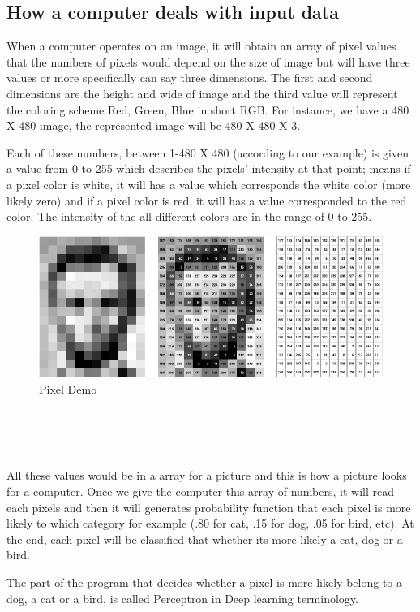 \subsection{How a computer deals with input data}
When a computer operates on an image, it will obtain an array  of pixel values that the numbers of pixels would depend on the size of image but will have three values or more specifically can say three dimensions. The first and second dimensions are the height and wide of image and the third value will represent the coloring scheme Red, Green, Blue in short RGB.  
For instance, we have a 480 X 480  image,  the  represented  image  will be 480 X 480 X 3. 

Each of these numbers, between 1-480 X 480 (according to our example) is given a value from 0 to 255 which describes the pixels' intensity at that point; means if a pixel color is white, it will has a value which corresponds the white color (more likely zero) and if a pixel color is red, it will has a value corresponded to the red color. The intensity of the all different colors are in the range of 0 to 255.

\begin{figure}[]
    \centering 
    \includegraphics[scale=0.7]{figures/pixel_demo.png}
    \caption{Pixel Demo}
\end{figure}
\\\
\\\

All these values would be in a array for a picture and this is how a picture looks for a computer. Once we give the computer this array of numbers, it will read each pixels and then it will generates probability function that each pixel is more likely to which category for example (.80 for cat, .15 for dog, .05 for bird, etc).
At the end, each pixel will be classified that whether its more likely a cat, dog or a bird.

The part of the program that decides whether a pixel is more likely belong to a dog, a cat or a bird, is called Perceptron in Deep learning terminology. 
\\\

